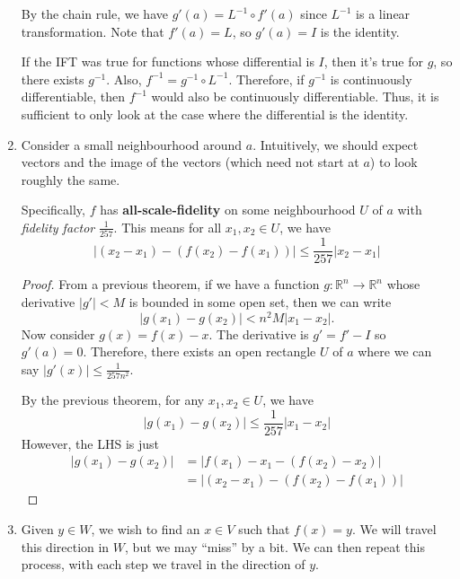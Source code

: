 \documentclass{article}
\begin{document}
\begin{enumerate}
\begin{center}
          \end{center}
          By the chain rule, we have $g'(a) = L^{-1} \circ f'(a)$ since $L^{-1}$ is a linear transformation. Note that $f'(a) = L$, so $g'(a) = I$ is the identity.

          If the IFT was true for functions whose differential is $I$, then it's true for $g$, so there exists $g^{-1}$. Also, $f^{-1} = g^{-1} \circ L^{-1}.$ Therefore, if $g^{-1}$ is continuously differentiable, then $f^{-1}$ would also be continuously differentiable. Thus, it is sufficient to only look at the case where the differential is the identity.

    \item Consider a small neighbourhood around $a$. Intuitively, we should expect vectors and the image of the vectors (which need not start at $a$) to look roughly the same.

          Specifically, $f$ has \textbf{all-scale-fidelity} on some neighbourhood $U$ of $a$ with \textit{fidelity factor} $\frac{1}{257}.$ This means for all $x_1,x_2 \in U$, we have
          \begin{equation}
              |(x_2-x_1) - (f(x_2)-f(x_1))| \le \frac{1}{257}|x_2-x_1|
          \end{equation}
          \begin{proof}
              From a previous theorem, if we have a function $g:\mathbb{R}^n\rightarrow\mathbb{R}^n$ whose derivative $|g'| < M$ is bounded in some open set, then we can write
              \begin{equation}
                  |g(x_1)-g(x_2)| < n^2M|x_1-x_2|.
              \end{equation}
              Now consider $g(x) = f(x) - x$. The derivative is $g'=f'-I$ so $g'(a)=0.$ Therefore, there exists an open rectangle $U$ of $a$ where we can say $|g'(x)| \le \frac{1}{257n^2}.$

              By the previous theorem, for any $x_1,x_2 \in U$, we have
              \begin{equation}
                  |g(x_1)-g(x_2)| \le \frac{1}{257}|x_1-x_2|
              \end{equation}
              However, the LHS is just
              \begin{align*}
                  |g(x_1)-g(x_2)| & = |f(x_1)-x_1-(f(x_2)-x_2)|   \\
                                  & = |(x_2-x_1)-(f(x_2)-f(x_1))|
              \end{align*}
          \end{proof}
    \item Given $y\in W$, we wish to find an $x \in V$ such that $f(x)=y$. We will travel this direction in $W$, but we may ``miss'' by a bit. We can then repeat this process, with each step we travel in the direction of $y$.


\end{enumerate}
\end{document}
